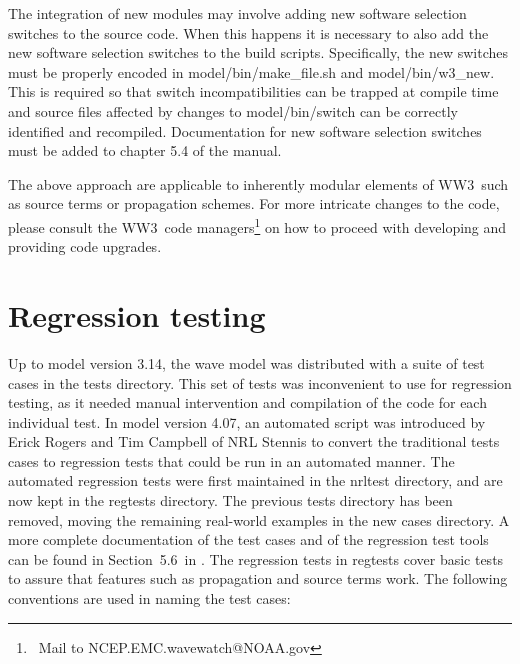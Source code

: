 \documentclass[12pt]{article}
\newcommand{\manref}{tol:MMABmanual}
\newcommand{\manregtestsec}{5.6}
\newcommand{\ws}{WW3}
\newcommand{\file}{\sf}
\newcommand{\pb}{\strut \vfill \pagebreak}
\newcommand{\newsec}{\setcounter{equation}{0}
                      \setcounter{myfigno}{0}
                      \setcounter{mytabno}{0}}
\newcounter{myfigno}[section]
\newcounter{mytabno}[section]
\begin{document}
\vspace{\baselineskip} \noindent The integration of new modules may involve
adding new software selection switches to the source code. When this happens
it is necessary to also add the new software selection switches to the build
scripts.  Specifically, the new switches must be properly encoded in {\file
  model/bin/make\_file.sh} and {\file model/bin/w3\_new}. This is required so
that switch incompatibilities can be trapped at compile time and source files
affected by changes to {\file model/bin/switch} can be correctly identified
and recompiled. Documentation for new software selection switches must be
added to chapter 5.4 of the manual.

\vspace{\baselineskip} \noindent The above approach are applicable to
inherently modular elements of \ws\ such as source terms or propagation
schemes. For more intricate changes to the code, please consult the \ws\ code
managers\footnote{~Mail to NCEP.EMC.wavewatch@NOAA.gov} on how to proceed with
developing and providing code upgrades.


\pb
\section{Regression testing} \label{sec:testing}
\newsec

Up to model version 3.14, the wave model was distributed with a suite of test
cases in the {\file tests} directory. This set of tests was inconvenient to
use for regression testing, as it needed manual intervention and compilation
of the code for each individual test. In model version 4.07, an automated
script was introduced by Erick Rogers and Tim Campbell of NRL Stennis to
convert the traditional tests cases to regression tests that could be run in
an automated manner. The automated regression tests were first maintained in
the {\file nrltest} directory, and are now kept in the {\file regtests}
directory.  The previous {\file tests} directory has been removed, moving the
remaining real-world examples in the new {\file cases} directory. A more
complete documentation of the test cases and of the regression test tools can
be found in Section~\manregtestsec\ in \cite{\manref}.  The regression tests
in {\file regtests} cover basic tests to assure that features such as
propagation and source terms work. The following conventions are used in
naming the test cases:
\end{document}
